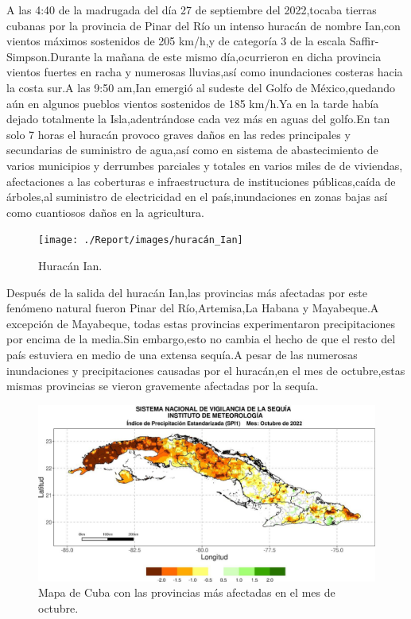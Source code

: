 \documentclass[12pt]{article}
\begin{document}
	
	A las 4:40 de la madrugada del día 27 de septiembre del 2022,tocaba tierras cubanas por la provincia de Pinar del Río un intenso huracán de nombre Ian,con vientos máximos sostenidos de 205 km/h,y de categoría 3 de la escala Saffir-Simpson.Durante la mañana de este mismo día,ocurrieron en dicha provincia vientos fuertes en racha y numerosas lluvias,así como inundaciones costeras hacia la costa sur.A las 9:50 am,Ian emergió al sudeste del Golfo de México,quedando aún en algunos pueblos vientos sostenidos de 185 km/h.Ya en la tarde había dejado totalmente la Isla,adentrándose cada vez más en aguas del golfo.En tan solo 7 horas el huracán provoco graves daños en las redes principales y secundarias de suministro de agua,así como en sistema de abastecimiento de varios municipios y derrumbes parciales y totales en varios miles de de viviendas, afectaciones a las coberturas e infraestructura de instituciones públicas,caída de árboles,al suministro de electricidad en el país,inundaciones en zonas bajas así como cuantiosos daños en la agricultura.\cite{webpage1}
	
	
	\begin{figure}[H]
		\centering
		\texttt{[image: ./Report/images/huracán\_Ian]}
		\caption{Huracán Ian.}
		\label{fig:huracanian}
	\end{figure}
	
	
	Después de la salida del huracán Ian,las provincias más afectadas por este fenómeno natural fueron Pinar del Río,Artemisa,La Habana y Mayabeque.A excepción de Mayabeque, todas estas provincias experimentaron precipitaciones por encima de la media.Sin embargo,esto no cambia el hecho de que el resto del país estuviera en medio de una extensa sequía.A pesar de las numerosas inundaciones y precipitaciones causadas por el huracán,en el mes de octubre,estas mismas provincias se vieron gravemente afectadas por la sequía.\cite{webpage2}
	
	\begin{figure}[H]
		\centering
		\includegraphics[width=0.8\linewidth]{./Report/images/mapa_octubre_ismet}
		\caption{Mapa de Cuba con las provincias más afectadas en el mes de octubre.}
		\label{fig:mapaoctubreismet}
	\end{figure}
	
\end{document}
